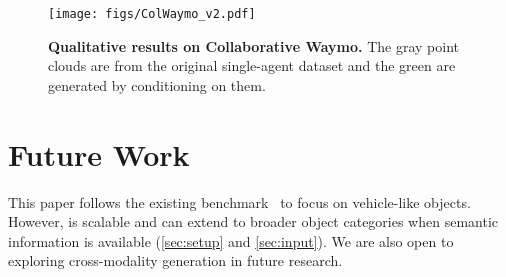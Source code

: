 \begin{figure*}
\centering
\texttt{[image: figs/ColWaymo\_v2.pdf]}
\caption{
\label{fig:colwaymo2}
\small \textbf{Qualitative results on Collaborative Waymo.} The gray point clouds are from the original single-agent dataset and the green are generated by \ours conditioning on them.}

\end{figure*}

\section{Future Work}
\label{sup:future}

This paper follows the existing benchmark~\citep{xu2022opv2v, xu2023v2v4real} to focus on vehicle-like objects. However, \ours is scalable and can extend to broader object categories when semantic information is available (\cf \cref{sec:setup} and \cref{sec:input}). We are also open to exploring cross-modality generation in future research.
